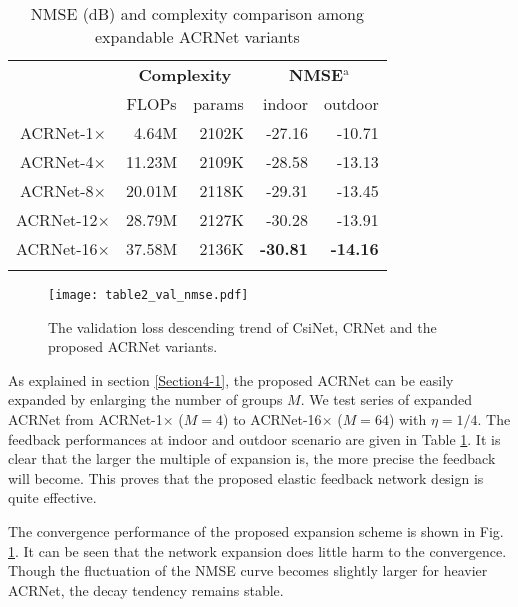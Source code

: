 \documentclass[12pt, draftclsnofoot, onecolumn]{IEEEtran}
\begin{document}
\begin{table}[!t]
\caption{NMSE (dB) and complexity comparison among expandable ACRNet variants}
\begin{center}
\makegapedcells \renewcommand\tabcolsep{10pt}
\begin{tabular}{c | r r | r r}
\Xhline{0.8pt}
\multirow{2}{*}{\textbf{Methods}} & \multicolumn{2}{c|}{\textbf{Complexity}} & \multicolumn{2}{c}{\textbf{NMSE}$^{\mathrm{a}}$} \\
& \multicolumn{1}{c}{FLOPs} & params & indoor & outdoor \\
\Xhline{0.8pt}
  ACRNet-1$\times$ & 4.64M & 2102K & -27.16 & -10.71 \\
  ACRNet-4$\times$ & 11.23M & 2109K & -28.58 & -13.13 \\
  ACRNet-8$\times$ & 20.01M & 2118K & -29.31 & -13.45 \\
  ACRNet-12$\times$ & 28.79M & 2127K & -30.28 & -13.91 \\
  ACRNet-16$\times$ & 37.58M & 2136K & \textbf{-30.81} & \textbf{-14.16} \\
\hline
\Xhline{0.8pt}
\multicolumn{5}{l}{$^{\mathrm{a}}$ $\eta$ is $1/4$ for both indoor and outdoor.} \\
\end{tabular}
\label{tab2}
\end{center}
\end{table}

\begin{figure}[!b]
\centering
\texttt{[image: table2\_val\_nmse.pdf]}
\caption{The validation loss descending trend of CsiNet, CRNet and the proposed ACRNet variants.}
\label{Table2 NMSE}
\end{figure}

As explained in section \ref{Section4-1}, the proposed ACRNet can be easily expanded by enlarging the number of groups $M$. We test series of expanded ACRNet from ACRNet-1$\times$ ($M=4$) to ACRNet-16$\times$ ($M=64$) with $\eta=1/4$. The feedback performances at indoor and outdoor scenario are given in Table \ref{tab2}. It is clear that the larger the multiple of expansion is, the more precise the feedback will become. This proves that the proposed elastic feedback network design is quite effective.

The convergence performance of the proposed expansion scheme is shown in Fig. \ref{Table2 NMSE}. It can be seen that the network expansion does little harm to the convergence. Though the fluctuation of the NMSE curve becomes slightly larger for heavier ACRNet, the decay tendency remains stable.
\end{document}
